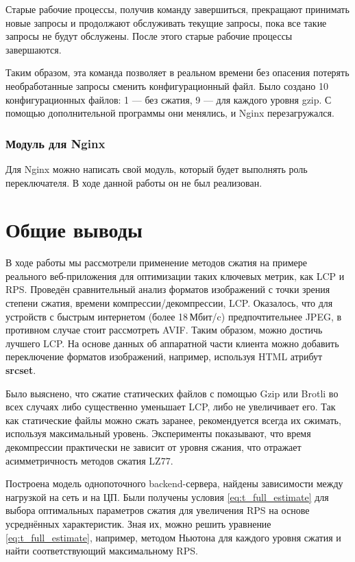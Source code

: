 \documentclass[12pt]{article}
\begin{document}
Старые рабочие процессы, получив команду завершиться, прекращают принимать новые запросы и продолжают обслуживать текущие запросы,
пока все такие запросы не будут обслужены. После этого старые рабочие процессы завершаются.

Таким образом, эта команда позволяет в реальном времени без опасения потерять необработанные запросы сменить конфигурационный файл.
Было создано 10 конфигурационных файлов: 1 — без сжатия, 9 — для каждого уровня gzip. С помощью дополнительной программы они менялись, и Nginx перезагружался.

\subsubsection{Модуль для Nginx}

Для Nginx можно написать свой модуль, который будет выполнять роль переключателя. В ходе данной работы он не был реализован.

\section{Общие выводы}
В ходе работы мы рассмотрели применение методов сжатия на примере реального веб-приложения для оптимизации таких ключевых метрик, как LCP и RPS.
Проведён сравнительный анализ форматов изображений с точки зрения степени сжатия, времени компрессии/декомпрессии,
LCP. Оказалось, что для устройств с быстрым интернетом (более 18\,Мбит/c) предпочтительнее JPEG, в противном случае стоит рассмотреть AVIF.
Таким образом, можно достичь лучшего LCP. На основе данных об аппаратной части клиента можно добавить переключение форматов изображений,
например, используя HTML атрибут \textbf{srcset}.

Было выяснено, что сжатие статических файлов с помощью Gzip или Brotli во всех случаях либо существенно уменьшает LCP,
либо не увеличивает его. Так как статические файлы можно сжать заранее, рекомендуется всегда их сжимать, используя максимальный уровень.
Эксперименты показывают, что время декомпрессии практически не зависит от уровня сжания, что отражает асимметричность методов сжатия LZ77.

Построена модель однопоточного backend-сервера, найдены зависимости между нагрузкой на сеть и на ЦП.
Были получены условия \eqref{eq:t_full_estimate} для выбора оптимальных параметров сжатия для увеличения
RPS на основе усреднённых характеристик. Зная их, можно решить уравнение \eqref{eq:t_full_estimate}, например, методом Ньютона
для каждого уровня сжатия и найти соответствующий максимальному RPS.
\end{document}
